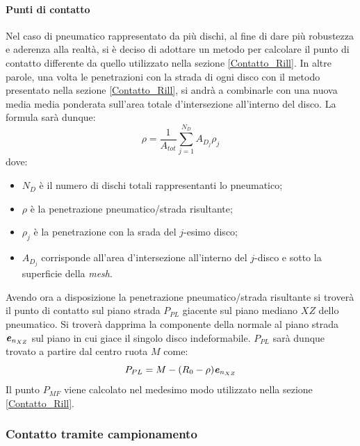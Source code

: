 \paragraph{Punti di contatto}
\label{Contatto_multidisk}
Nel caso di pneumatico rappresentato da più dischi, al fine di dare più robustezza e aderenza alla realtà, si è deciso di adottare un metodo per calcolare il punto di contatto differente da quello utilizzato nella sezione \ref{Contatto_Rill}. In altre parole, una volta le penetrazioni con la strada di ogni disco con il metodo presentato nella sezione \ref{Contatto_Rill}, si andrà a combinarle con una nuova media media ponderata sull'area totale d'intersezione all'interno del disco. La formula sarà dunque:
%
\begin{equation}
\rho = \frac{1}{A_{tot}}\sum_{j=1}^{N_D}A_{D_j}\rho_j
\end{equation}
%
dove:
\begin{itemize}
	\item $N_D$ è il numero di dischi totali rappresentanti lo pneumatico;
	\item $\rho$ è la penetrazione pneumatico/strada risultante;
	\item $\rho_j$ è la penetrazione con la srada del $j$-esimo disco;
	\item $A_{D_j}$ corrisponde all'area d'intersezione all'interno del $j$-disco e sotto la superficie della \textit{mesh}.
\end{itemize}

Avendo ora a disposizione la penetrazione pneumatico/strada risultante si troverà il punto di contatto sul piano strada $P_{PL}$ giacente sul piano mediano $XZ$ dello pneumatico. Si troverà dapprima la componente della normale al piano strada $\textbf{\textit{e}}_{n_{XZ}}$ sul piano in cui giace il singolo disco indeformabile. $P_{PL}$ sarà dunque trovato a partire dal centro ruota $M$ come:
%
\begin{equation}
P_{PL} = M-(R_0-\rho)\textbf{\textit{e}}_{n_{XZ}}
\end{equation}
Il punto $P_{MF}$ viene calcolato nel medesimo modo utilizzato nella sezione \ref{Contatto_Rill}.
%
\subsubsection{Contatto tramite campionamento}
